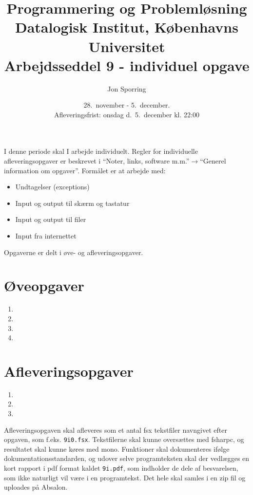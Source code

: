 \documentclass[a4paper,12pt]{article}
\title{Programmering og Problemløsning\\Datalogisk Institut,
  Københavns Universitet\\Arbejdsseddel 9 - individuel opgave}
\author{Jon Sporring}
\date{28.\ november - 5.\ december.\\Afleveringsfrist: onsdag d.\ 5.\ december kl. 22:00}
\begin{document}
\maketitle

I denne periode skal I arbejde individuelt. Regler for individuelle afleveringsopgaver er beskrevet i "`Noter, links, software m.m."'$\rightarrow$"`Generel information om opgaver"'. Formålet er at arbejde med:
\begin{itemize}
\item Undtagelser (exceptions)
\item Input og output til skærm og tastatur
\item Input og output til filer
\item Input fra internettet
\end{itemize}

Opgaverne er delt i øve- og afleveringsopgaver. 

\section*{Øveopgaver}

\begin{enumerate}[label=9ø.\arabic*,start=0]
\item 
\item 
\item 
\item 
\end{enumerate}

\section*{Afleveringsopgaver}
\begin{enumerate}[label=9i.\arabic*,start=0]
\item 
\item 
\item 
\end{enumerate}

Afleveringsopgaven skal afleveres som et antal fsx tekstfiler navngivet efter opgaven, som f.eks. \lstinline!9i0.fsx!. Tekstfilerne skal kunne oversættes med fsharpc, og resultatet skal kunne køres med mono. Funktioner skal dokumenteres ifølge dokumentationsstandarden, og udover selve programteksten skal der vedlægges en kort rapport i pdf format kaldet \lstinline{9i.pdf}, som indholder de dele af besvarelsen, som ikke naturligt vil være i en programtekst. Det hele skal samles i en zip fil og uploades på Absalon.
\end{document}
